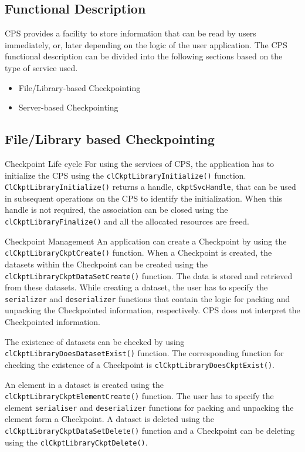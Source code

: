 \begin{flushleft}
\section{Functional Description}
CPS provides a facility to store information that can be read by users immediately, or, later depending 
on the logic of the user application. The CPS functional description can be divided into the following sections based on the type of service used.
\begin{itemize}
\item
File/Library-based Checkpointing
\item
Server-based Checkpointing
\end{itemize}

\subsection{File/Library based Checkpointing}
\begin{Desc}
\item
[Checkpoint Life cycle]
For using the services of CPS, the application has to initialize the CPS using the {\tt{clCkptLibraryInitialize()}} function. {\tt{ClCkptLibraryInitialize()}}
returns a handle, {\tt{ckptSvcHandle}}, that can be used in subsequent operations on the CPS to identify the initialization. When this handle is not required, 
the association can be closed using the {\tt{clCkptLibraryFinalize()}} and all the allocated resources are freed.
\end{Desc}


\begin{Desc}
\item
[Checkpoint Management]
An application can create a Checkpoint by using the {\tt{clCkptLibraryCkptCreate()}} function. When a Checkpoint is created, the datasets within the Checkpoint can be 
created using the {\tt{clCkptLibraryCkptDataSetCreate()}} function. The data is stored and retrieved from these datasets. While creating a dataset, the user has to 
specify the {\tt{serializer}} and {\tt{deserializer}} functions that contain the logic for packing and unpacking the Checkpointed information, respectively. 
CPS does not interpret the Checkpointed information.
\par
The existence of datasets can be checked by using {\tt{clCkptLibraryDoesDatasetExist()}} function. The corresponding function for checking the existence of a Checkpoint
is {\tt{clCkptLibraryDoesCkptExist()}}.
\par
An element in a dataset is created using the {\tt{clCkptLibraryCkptElementCreate()}} function. The user has to specify the element 
{\tt{serialiser}} and {\tt{deserializer}} functions for packing and unpacking the element form a Checkpoint. A dataset is deleted using the 
{\tt{clCkptLibraryCkptDataSetDelete()}} function and a Checkpoint can be deleting using the {\tt{clCkptLibraryCkptDelete()}}.
\end{Desc}


\end{flushleft}
